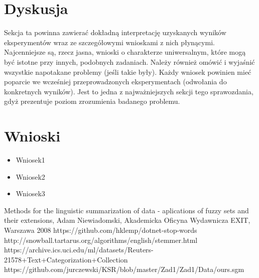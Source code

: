 \documentclass{classrep}
\begin{document}
\section{Dyskusja}



{\color{blue}
Sekcja ta powinna zawierać dokładną interpretację uzyskanych wyników
eksperymentów wraz ze szczegółowymi wnioskami z nich płynącymi. Najcenniejsze
są, rzecz jasna, wnioski o charakterze uniwersalnym, które mogą być istotne
przy innych, podobnych zadaniach. Należy również omówić i wyjaśnić wszystkie
napotakane problemy (jeśli takie były). Każdy wniosek powinien mieć poparcie
we wcześniej przeprowadzonych eksperymentach (odwołania do konkretnych
wyników). Jest to jedna z najważniejszych sekcji tego sprawozdania, gdyż
prezentuje poziom zrozumienia badanego problemu.}
\section{Wnioski}
\begin{itemize}
\item Wniosek1
\item Wniosek2
\item Wniosek3
\end{itemize}

\begin{thebibliography}{}
Methods for the linguistic summarization of data - aplications of fuzzy sets and their extensions, Adam Niewiadomski, Akademicka Oficyna Wydawnicza EXIT, Warszawa 2008
https://github.com/hklemp/dotnet-stop-words
http://snowball.tartarus.org/algorithms/english/stemmer.html
https://archive.ics.uci.edu/ml/datasets/Reuters-21578+Text+Categorization+Collection
https://github.com/jurczewski/KSR/blob/master/Zad1/Zad1/Data/ours.sgm
\end{thebibliography}
\end{document}
